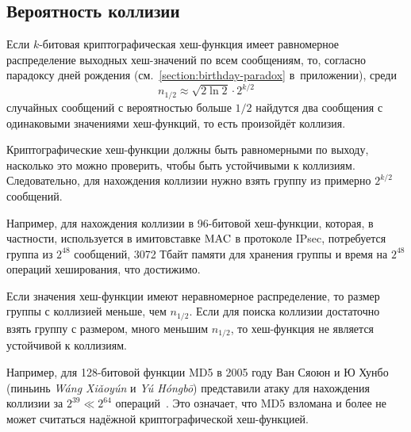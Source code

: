\subsection{Вероятность коллизии}

Если $k$-битовая криптографическая хеш-функция имеет равномерное распределение выходных хеш-значений по всем сообщениям, то, согласно парадоксу дней рождения (см.~\autoref{section:birthday-paradox} в~приложении), среди
    \[ n_{1/2} \approx \sqrt{2 \ln 2} \cdot 2^{k/2} \]
случайных сообщений с вероятностью больше $1/2$ найдутся два сообщения с одинаковыми значениями хеш-функций, то есть произойдёт коллизия.

Криптографические хеш-функции должны быть равномерными по выходу, насколько это можно проверить, чтобы быть устойчивыми к коллизиям. Следовательно, для нахождения коллизии нужно взять группу из примерно $2^{k/2}$ сообщений.

Например, для нахождения коллизии в 96-битовой хеш-функ\-ции, которая, в частности, используется в имитовставке $\textrm{MAC}$ в протоколе IPsec, потребуется группа из $2^{48}$ сообщений, 3072 Тбайт памяти для хранения группы и время на $2^{48}$ операций хеширования, что достижимо.

Если значения хеш-функции имеют неравномерное распределение, то размер группы с коллизией меньше, чем $n_{1/2}$. Если для поиска коллизии достаточно взять группу с размером, много меньшим $n_{1/2}$, то хеш-функция не является устойчивой к коллизиям.

Например, для 128-битовой функции MD5 в 2005 году Ван Сяоюн и Ю Хунбо (пиньинь \textit{Wáng Xiǎo\-yún} и \textit{Yú Hóng\-bō}) представили атаку для нахождения коллизии за $2^{39} \ll 2^{64}$ операций~\cite{WangYu:2005}. Это означает, что MD5 взломана и более не может считаться надёжной криптографической хеш-функцией.
